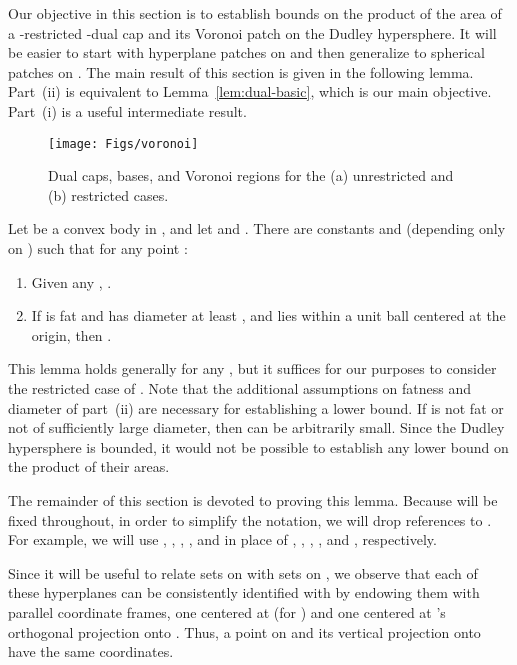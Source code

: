 \documentclass[11pt]{article}   \usepackage[letterpaper,hmargin=2.1cm,vmargin=3cm]{geometry}
\begin{document}
Our objective in this section is to establish bounds on the product of the area of a -restricted -dual cap and its Voronoi patch on the Dudley hypersphere. It will be easier to start with hyperplane patches on  and then generalize to spherical patches on . The main result of this section is given in the following lemma. Part~(ii) is equivalent to Lemma~\ref{lem:dual-basic}, which is our main objective. Part~(i) is a useful intermediate result.

\begin{figure}[htbp]
  \centerline{\texttt{[image: Figs/voronoi]}}
  \caption{Dual caps, bases, and Voronoi regions for the (a) unrestricted and (b) restricted cases.}
  \label{fig:voronoi}
\end{figure}


\begin{lemma} \label{lem:dual}
Let  be a convex body in , and let  and . There are constants  and  (depending only on ) such that for any point :
\begin{enumerate}
\item[]  Given any , .

\item[] If  is fat and has diameter at least , and  lies within a unit ball centered at the origin, then .
\end{enumerate}
\end{lemma}


This lemma holds generally for any , but it suffices for our purposes to consider the restricted case of . Note that the additional assumptions on fatness and diameter of part~(ii) are necessary for establishing a lower bound. If  is not fat or not of sufficiently large diameter, then  can be arbitrarily small. Since the Dudley hypersphere is bounded, it would not be possible to establish any lower bound on the product of their areas. 

The remainder of this section is devoted to proving this lemma. Because  will be fixed throughout, in order to simplify the notation, we will drop references to . For example, we will use , , , , and  in place of , , , , and , respectively.

Since it will be useful to relate sets on  with sets on , we observe that each of these hyperplanes can be consistently identified with  by endowing them with parallel coordinate frames, one centered at  (for ) and one centered at 's orthogonal projection onto . Thus, a point on  and its vertical projection onto  have the same coordinates.
\end{document}
